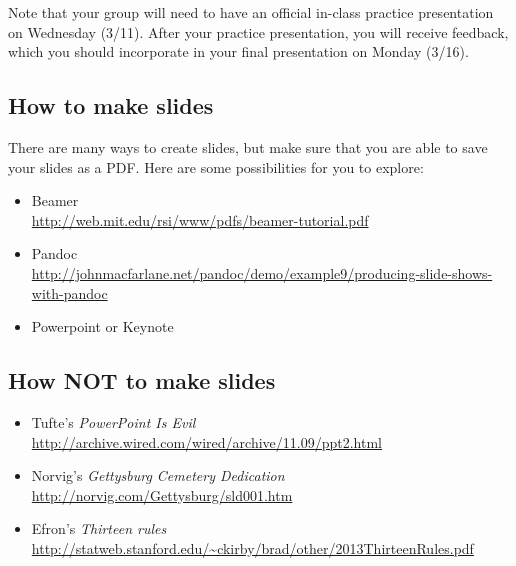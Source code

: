 \documentclass[11pt, oneside]{article}   	%
\begin{document}
Note that your group will need to have an official in-class practice presentation
on Wednesday (3/11).  After your practice presentation, you will receive feedback,
which you should incorporate in your final presentation on Monday (3/16).

\subsection*{How to make slides}

There are many ways to create slides, but make sure that you are able to
save your slides as a PDF.  Here are some possibilities for you to explore:
\begin{itemize}
\item Beamer\\
 \url{http://web.mit.edu/rsi/www/pdfs/beamer-tutorial.pdf}
\item Pandoc\\
 \url{http://johnmacfarlane.net/pandoc/demo/example9/producing-slide-shows-with-pandoc}
\item Powerpoint or Keynote
\end{itemize}

\subsection*{How \textbf{NOT} to make slides}

\begin{itemize}
\item Tufte's \emph{PowerPoint Is Evil}\\
 \url{http://archive.wired.com/wired/archive/11.09/ppt2.html}
\item Norvig's \emph{Gettysburg Cemetery Dedication}\\
 \url{http://norvig.com/Gettysburg/sld001.htm}
\item Efron's \emph{Thirteen rules}\\
 \url{http://statweb.stanford.edu/~ckirby/brad/other/2013ThirteenRules.pdf}
\end{itemize}
\end{document}
